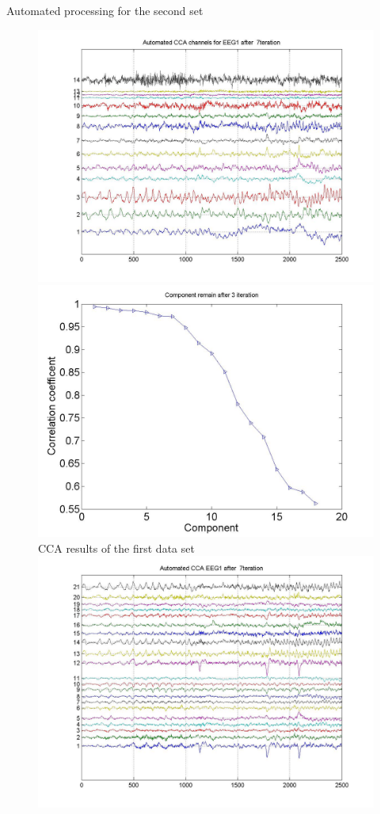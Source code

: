 \documentclass[t,12pt,english
\ifx\beamermode\undefined\else,\beamermode\fi
]{beamer}
\begin{document}
 
 
\begin{frame}{Automated processing for the second set }


\begin{figure}[!htbp]
%
\centering
\includegraphics[width=.8\textwidth]{27.jpg}\\
\includegraphics[width=.8\textwidth]{14.jpg}\\
\tiny{CCA results of the first data set}\label{toda1}
\endminipage\hfill
{}%
\centering
\includegraphics[width=.8\textwidth]{28.jpg}\\

\end{figure}
\end{frame}
\end{document}
